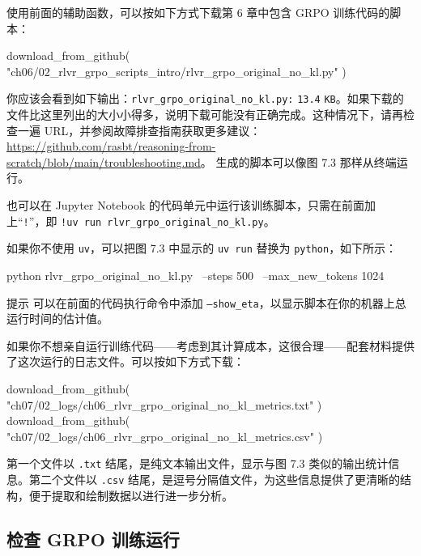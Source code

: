 使用前面的辅助函数，可以按如下方式下载第 6 章中包含 GRPO 训练代码的脚本：

\begin{codebox}
download_from_github(
    "ch06/02_rlvr_grpo_scripts_intro/rlvr_grpo_original_no_kl.py"
)
\end{codebox}

你应该会看到如下输出：\texttt{rlvr\_grpo\_original\_no\_kl.py:} \texttt{13.4} \texttt{KB}。如果下载的文件比这里列出的大小小得多，说明下载可能没有正确完成。这种情况下，请再检查一遍 URL，并参阅故障排查指南获取更多建议：\href{https://github.com/rasbt/reasoning-from-scratch/blob/main/troubleshooting.md}{https://github.com/rasbt/reasoning-from-scratch/blob/main/troubleshooting.md}。 生成的脚本可以像图 7.3 那样从终端运行。


也可以在 Jupyter Notebook 的代码单元中运行该训练脚本，只需在前面加上“\texttt{!}”，即 \texttt{!uv run rlvr\_grpo\_original\_no\_kl.py}。

如果你不使用 \texttt{uv}，可以把图 7.3 中显示的 \texttt{uv run} 替换为 \texttt{python}，如下所示：

\begin{codebox}
python rlvr_grpo_original_no_kl.py \
--steps 500 \
--max_new_tokens 1024
\end{codebox}

\begin{myWarning}{提示}
 可以在前面的代码执行命令中添加 \texttt{--show\_eta}，以显示脚本在你的机器上总运行时间的估计值。\end{myWarning}

如果你不想亲自运行训练代码——考虑到其计算成本，这很合理——配套材料提供了这次运行的日志文件。可以按如下方式下载：

\begin{codebox}
download_from_github(
    "ch07/02_logs/ch06_rlvr_grpo_original_no_kl_metrics.txt"
)
download_from_github(
    "ch07/02_logs/ch06_rlvr_grpo_original_no_kl_metrics.csv"
)
\end{codebox}

第一个文件以 \texttt{.txt} 结尾，是纯文本输出文件，显示与图 7.3 类似的输出统计信息。第二个文件以 \texttt{.csv} 结尾，是逗号分隔值文件，为这些信息提供了更清晰的结构，便于提取和绘制数据以进行进一步分析。

\subsection{检查 GRPO 训练运行}

